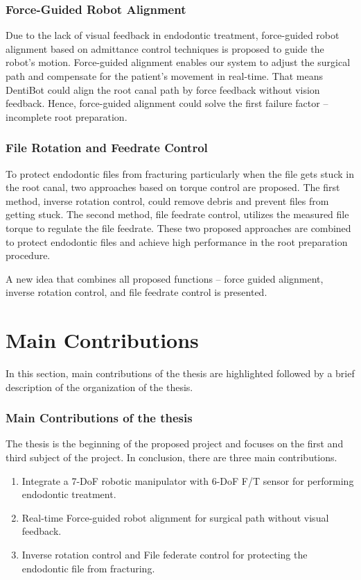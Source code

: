 \subsubsection{Force-Guided Robot Alignment}
\hspace*{6mm}Due to the lack of visual feedback in endodontic treatment, force-guided robot alignment based on admittance control techniques is proposed to guide the robot's motion. Force-guided alignment enables our system to adjust the surgical path and compensate for the patient's movement in real-time. That means DentiBot could align the root canal path by force feedback without vision feedback. Hence, force-guided alignment could solve the first failure factor -- incomplete root preparation.
\subsubsection{File Rotation and Feedrate Control}
\hspace*{6mm}To protect endodontic files from fracturing particularly when the file gets stuck in the root canal, two approaches based on  torque control are proposed. The first method, inverse rotation control, could remove debris and prevent files from getting stuck. The second method, file feedrate control, utilizes the measured file torque to regulate the file feedrate. These two proposed approaches are combined to protect endodontic files and achieve high performance in the root preparation procedure. 
\par 
A new idea that combines all proposed functions -- force guided alignment, inverse rotation control, and file feedrate control is presented.
\newpage
\section{Main Contributions}
\hspace*{6mm}In this section, main contributions of the thesis are highlighted followed by a brief description of the organization of the thesis.
\subsubsection{Main Contributions of the thesis}
\label{sec:contributions}
\hspace*{6mm}The thesis is the beginning of the proposed project and focuses on the first and  third subject of the project. In conclusion, there are three main contributions.
\begin{enumerate}
	\item	Integrate a 7-DoF robotic manipulator with 6-DoF F/T sensor for performing endodontic treatment.

	\item	Real-time Force-guided robot alignment for surgical path without visual feedback.
	\item	Inverse rotation control and File federate control for protecting the endodontic file from fracturing.
\end{enumerate}
